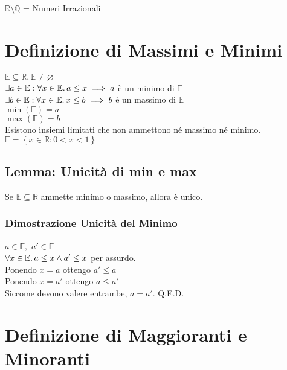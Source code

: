 \documentclass[a4paper, twoside, italian, 11pt]{book}
\newcommand{\braces}[1] {\left \{ #1 \right \}}
\newcommand{\Q}{\mathbb{Q}}
\newcommand{\R}{\mathbb{R}}
\newcommand{\E}{\mathbb{E}}
\let\emptyset\varnothing
\begin{document}
\noindent
$\R \setminus \Q$ = Numeri Irrazionali



\section{Definizione di Massimi e Minimi}

$\E \subseteq \R, \E \neq \emptyset$ \\

$\exists a \in \E : \forall x \in \E \ldotp a \leq x \implies a$ è un minimo di $\E$ \\

$\exists b \in \E : \forall x \in \E \ldotp x \leq b \implies b$ è un massimo di $\E$ \\

$\min(\E) = a$ \\
\indent
$\max(\E) = b$ \\

\noindent
Esistono insiemi limitati che non ammettono né massimo né minimo. \\

$\E = \braces{x \in \R : 0 < x < 1}$


\subsection{Lemma: Unicità di min e max}

Se $\E \subseteq \R$ ammette minimo o massimo, allora è unico.


\subsubsection{Dimostrazione Unicità del Minimo}

\noindent
$a \in \E,$ $a' \in \E$ \\

\noindent
$\forall x \in \E \ldotp a \leq x \land a' \leq x$ per assurdo. \\

\noindent
Ponendo $x = a$ ottengo $a' \leq a$ \\
Ponendo $x = a'$ ottengo $a \leq a'$ \\

\noindent
Siccome devono valere entrambe, $a = a'$. Q.E.D.



\section{Definizione di Maggioranti e Minoranti}
\end{document}
